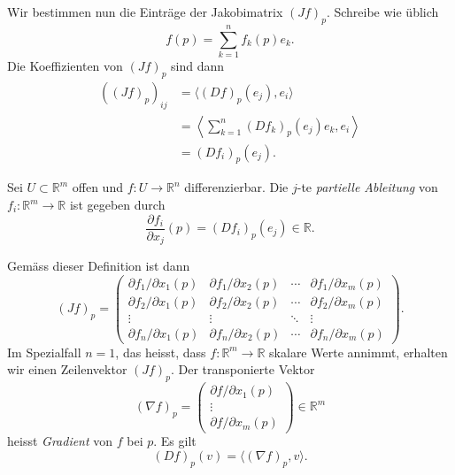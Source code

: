 \documentclass[../main.tex]{subfiles}
\begin{document}
Wir bestimmen nun die Einträge der Jakobimatrix
${(Jf)}_p$.
Schreibe wie üblich
\[
  f(p) = \sum_{k=1}^{n} f_k(p) e_k.
\]
Die Koeffizienten von ${(Jf)}_p$ sind dann
\begin{align*}
  {({(Jf)}_p)}_{ij}
  &= \langle {(Df)}_p(e_j), e_i \rangle  \\
  &= \left\langle
    \sum_{k=1}^{n} {(Df_k)}_p(e_j) e_k,
    e_i
  \right\rangle \\
  &= {(Df_i)}_p(e_j).
\end{align*}

\begin{definition}
  Sei $U \subset \mathbb{R}^m$ offen und
  $f \colon U \to \mathbb{R}^n$ differenzierbar.
  Die $j$-te \emph{partielle Ableitung}
  von $f_i \colon \mathbb{R}^m \to \mathbb{R}$ ist
  gegeben durch
  \[
    \frac{\partial f_i}{\partial x_j}(p) = {(Df_i)}_p(e_j) \in \mathbb{R}.
  \]
\end{definition}

Gemäss dieser Definition ist dann
\[
  {(Jf)}_p =
  \begin{pmatrix}
    {\partial f_1}/{\partial x_1}(p)
    & {\partial f_1}/{\partial x_2}(p)
    & \cdots
    &{\partial f_1}/{\partial x_m}(p)
    \\
    {\partial f_2}/{\partial x_1}(p)
    & {\partial f_2}/{\partial x_2}(p)
    & \cdots
    & {\partial f_2}/{\partial x_m}(p)\\
    \vdots & \vdots & \ddots & \vdots \\
    \partial f_n / \partial x_1 (p)
    & \partial f_n / \partial x_2 (p)
    & \cdots
    & \partial f_n / \partial x_m(p)
  \end{pmatrix}.
\]
Im Spezialfall $n = 1$, das heisst,
dass $f \colon \mathbb{R}^m \to \mathbb{R}$
skalare Werte annimmt, erhalten wir
einen Zeilenvektor ${(Jf)}_p$.
Der transponierte Vektor
 \[
   {(\nabla f)}_p =
   \begin{pmatrix}
     \partial f / \partial x_1 (p) \\
     \vdots \\
     \partial f/ \partial x_m (p)
   \end{pmatrix}
   \in \mathbb{R}^m
\]
heisst \emph{Gradient} von $f$ bei $p$.
Es gilt
\[
  {(Df)}_p(v) = \langle {(\nabla f)}_p, v \rangle.
\]
\end{document}
